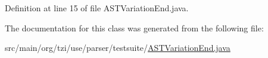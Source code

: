 Definition at line 15 of file A\-S\-T\-Variation\-End.\-java.



The documentation for this class was generated from the following file\-:\begin{DoxyCompactItemize}
\item 
src/main/org/tzi/use/parser/testsuite/\hyperlink{_a_s_t_variation_end_8java}{A\-S\-T\-Variation\-End.\-java}\end{DoxyCompactItemize}
